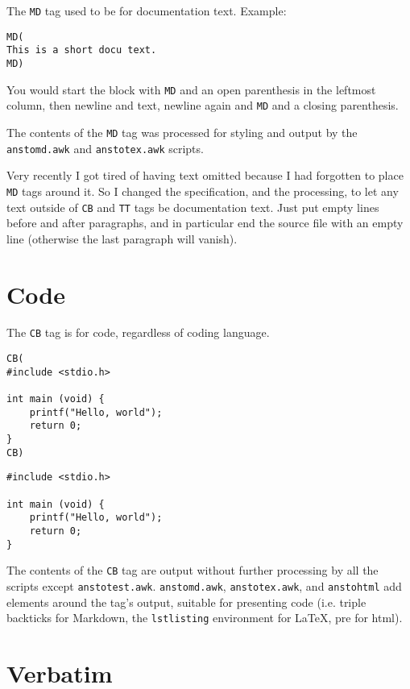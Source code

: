 The \texttt{MD} tag used to be for documentation text. Example:

\begin{verbatim}
MD(
This is a short docu text.
MD)
\end{verbatim}

You would start the block with \texttt{MD} and an open parenthesis in the leftmost column, then newline and text, newline again and \texttt{MD} and a closing parenthesis.


The contents of the \texttt{MD} tag was processed for styling and output by the \texttt{anstomd.awk} and \texttt{anstotex.awk} scripts.


Very recently I got tired of having text omitted because I had forgotten to place \texttt{MD} tags around it. So I changed the specification, and the processing, to let any text outside of \texttt{CB} and \texttt{TT} tags be documentation text. Just put empty lines before and after paragraphs, and in particular end the source file with an empty line (otherwise the last paragraph will vanish).

\section{Code}
\label{code}

The \texttt{CB} tag is for code, regardless of coding language.

\begin{verbatim}
CB(
#include <stdio.h>

int main (void) {
    printf("Hello, world");
    return 0;
}
CB)
\end{verbatim}
\begin{lstlisting}
#include <stdio.h>

int main (void) {
    printf("Hello, world");
    return 0;
}
\end{lstlisting}

The contents of the \texttt{CB} tag are output without further processing by all the scripts except \texttt{anstotest.awk}. \texttt{anstomd.awk}, \texttt{anstotex.awk}, and \texttt{anstohtml} add elements around the tag's output, suitable for presenting code (i.e. triple backticks for Markdown, the \texttt{lstlisting} environment for \LaTeX{}, pre for html).

\section{Verbatim}
\label{verbatim}


